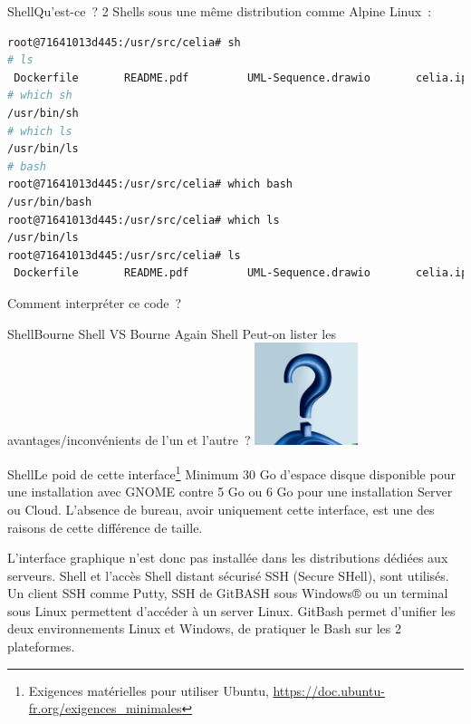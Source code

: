 \documentclass{beamer}
\begin{document}
    \begin{frame}[fragile]{Shell}{Qu'est-ce~?}
        2 Shells sous une même distribution  comme Alpine Linux~:
        \begin{lstlisting}[language=bash]
root@71641013d445:/usr/src/celia# sh
# ls
 Dockerfile       README.pdf         UML-Sequence.drawio       celia.ipynb
# which sh
/usr/bin/sh
# which ls
/usr/bin/ls
# bash
root@71641013d445:/usr/src/celia# which bash
/usr/bin/bash
root@71641013d445:/usr/src/celia# which ls
/usr/bin/ls
root@71641013d445:/usr/src/celia# ls
 Dockerfile       README.pdf         UML-Sequence.drawio       celia.ipynb
        \end{lstlisting}
        \bigbreak
        Comment interpréter ce code~?
    \end{frame}

    \begin{frame}{Shell}{Bourne Shell VS Bourne Again Shell}
        Peut-on lister les avantages/inconvénients de l'un et l'autre~?
        \bigbreak
        \centering
        \includegraphics[width=3cm]{image/question-mark-on-a-blank-background.png}
    \end{frame}

    \begin{frame}{Shell}{Le poid de cette interface\footnote{Exigences matérielles pour utiliser Ubuntu, \url{https://doc.ubuntu-fr.org/exigences_minimales}}}
        Minimum 30 Go d'espace disque disponible pour une installation avec GNOME contre 5 Go ou 6 Go pour une installation Server ou Cloud.
        \bigbreak
        L'absence de bureau, avoir uniquement cette interface, est une des raisons de cette différence de taille.

        L'interface graphique n'est donc pas installée dans les distributions dédiées aux serveurs.
        Shell et l'accès Shell distant sécurisé SSH (Secure SHell), sont utilisés.
        Un client SSH comme Putty, SSH de GitBASH sous Windows® ou un terminal sous Linux permettent d'accéder à un server Linux.
        \bigbreak
        GitBash permet d'unifier les deux environnements Linux et Windows, de pratiquer le Bash sur les 2 plateformes.
    \end{frame}
\end{document}
